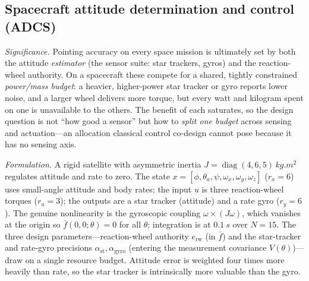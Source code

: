\documentclass[twocolumn,amsthm]{autart}
\begin{document}
\subsection{Spacecraft attitude determination and control (ADCS)}
\label{sec:sim:adcs}

\emph{Significance.} Pointing accuracy on every space mission is ultimately set
by both the attitude \emph{estimator} (the sensor suite: star trackers, gyros)
and the reaction-wheel authority. On a spacecraft these compete for a shared,
tightly constrained \emph{power/mass budget}: a heavier, higher-power star tracker
or gyro reports lower noise, and a larger wheel delivers more torque, but every
watt and kilogram spent on one is unavailable to the others. The benefit of each
saturates, so the design question is not ``how good a sensor'' but how to
\emph{split one budget} across sensing and actuation---an allocation classical
control co-design cannot pose because it has no sensing axis.

\emph{Formulation.} A rigid satellite with asymmetric inertia
$J=\operatorname{diag}(4,6,5)\,\si{kg.m^2}$ regulates attitude and rate to zero.
The state $x=[\phi,\theta_a,\psi,\omega_x,\omega_y,\omega_z]$ ($r_x=6$) uses
small-angle attitude and body rates; the input $u$ is three reaction-wheel
torques ($r_u=3$); the outputs are a star tracker (attitude) and a rate gyro
($r_y=6$). The genuine nonlinearity is the gyroscopic coupling $\omega\times
(J\omega)$, which vanishes at the origin so $\bar f(0,0;\theta)=0$ for all
$\theta$; integration is at $\SI{0.1}{s}$ over $N=15$. The three design
parameters---reaction-wheel authority $e_{\mathrm{rw}}$ (in $\bar f$) and the
star-tracker and rate-gyro precisions $\alpha_{\mathrm{st}},\alpha_{\mathrm{gyro}}$
(entering the measurement covariance $V(\theta)$)---draw on a single resource
budget. Attitude error is weighted four times more heavily than rate, so the star
tracker is intrinsically more valuable than the gyro.
\end{document}

